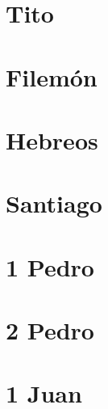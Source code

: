 \chapter{Tito}
\begin{multicols}{2}
  \parskip=0pt \relax
  
\end{multicols}

\chapter{Filemón}
\begin{multicols}{2}
  \parskip=0pt \relax
  
\end{multicols}

\chapter{Hebreos}
\begin{multicols}{2}
  \parskip=0pt \relax
  
\end{multicols}

\chapter{Santiago}
\begin{multicols}{2}
  \parskip=0pt \relax
  
\end{multicols}

\chapter{1 Pedro}
\begin{multicols}{2}
  \parskip=0pt \relax
  
\end{multicols}

\chapter{2 Pedro}
\begin{multicols}{2}
  \parskip=0pt \relax
  
\end{multicols}

\chapter{1 Juan}
\begin{multicols}{2}
  \parskip=0pt \relax
  
\end{multicols}

